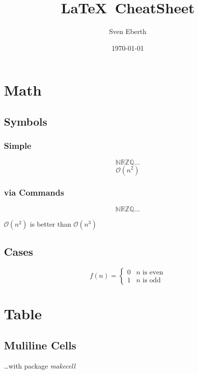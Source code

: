 \documentclass[a4paper, 11pt]{article}
\title{\LaTeX~CheatSheet}
\author{Sven Eberth}
\date{\today}
\begin{document}
    \maketitle
    \tableofcontents
    \newpage
	\hypersetup{linkcolor=red}  %
	
	\section{Math}\label{sec:math}
		\subsection{Symbols}
			\subsubsection{Simple}
		    \[ \mathbb{N R Z Q} \ldots \]
		    \[ \mathcal{O}(n^2) \]
		
		    \subsubsection{via Commands}
		    \newcommand{\N}[0]{\mathbb{N}}
		    \newcommand{\R}[0]{\mathbb{R}}
		    \newcommand{\Z}[0]{\mathbb{Z}}
		    \newcommand{\Q}[0]{\mathbb{Q}}
		    
		    \newcommand{\bigO}[1]{\ensuremath{\mathcal{O}(#1)}}
		
		    \[ \N \R \Z \Q \ldots \]
		    \begin{center}
				\bigO{n^2} is better than $\bigO{n^3}$
			\end{center}
			
    \subsection{Cases}
		  \[
		    f(n) = \begin{cases}
				  0       & n \text{ is even} \\
				  1       & n \text{ is odd}
				\end{cases}
      \]


  \section{Table}\label{sec:table}
		\subsection{Muliline Cells}
			\ldots with package \textit{makecell}
			
\end{document}
